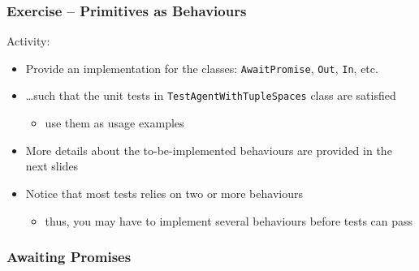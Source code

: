 \documentclass[presentation]{beamer}\mode<presentation>{\usetheme{AMSCesenaPurpleAndGold}}
\begin{document}
\begin{frame}[allowframebreaks]
	\frametitle{Exercise \currentExercise{} -- \linda{} Primitives as Behaviours}
	
	Activity:
	\bigskip
	\begin{itemize}
		
		\item Provide an implementation for the classes: \texttt{AwaitPromise}, \texttt{Out}, \texttt{In}, etc.
		
		\bigskip
		
		\item \ldots such that the \alert{unit tests} in \alert{\texttt{TestAgentWithTupleSpaces}} class are satisfied
		\begin{itemize}
			\item use them as usage examples
		\end{itemize}
		
		\bigskip
		
		\item More details about the to-be-implemented behaviours are provided in the next slides
		
		\bigskip
		
		\item Notice that most tests relies on two or more behaviours
		\begin{itemize}
			\item thus, you may have to implement several behaviours before tests can pass
		\end{itemize}
	\end{itemize}
	
\end{frame}

\subsubsection{Awaiting Promises}
\end{document}

